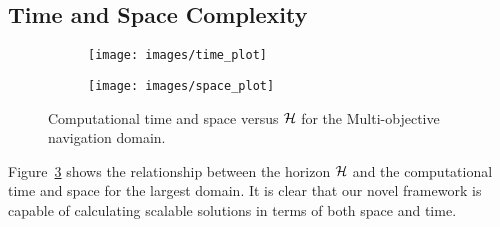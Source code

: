 %    
%    

\subsection{Time and Space Complexity}

\begin{figure}[h!]
    \centering
    \begin{subfigure}[b]{0.4\textwidth}    
        \texttt{[image: images/time\_plot]}
        \label{fig:time_complexity}        
    \end{subfigure}
    
    \begin{subfigure}[b]{0.4\textwidth}    
        \texttt{[image: images/space\_plot]}
        \label{fig:space_complexity}        
    \end{subfigure}    
    \caption{Computational time and space versus {\footnotesize $ \mathcal{H} $} for the Multi-objective navigation domain.}
    \label{fig:time_space_complexity}    
\end{figure}

Figure~\ref{fig:time_space_complexity} shows the relationship between the horizon $ \mathcal{H} $ and the computational time and space for the largest domain. It is clear that our novel framework is capable of calculating scalable solutions in terms of both space and time.

